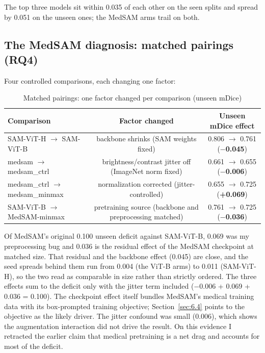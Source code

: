 \documentclass[conference]{IEEEtran}
\begin{document}
The top three models sit within 0.035 of each other on the seen splits and spread by 0.051 on the unseen ones; the MedSAM arms trail on both.


\subsection{The MedSAM diagnosis: matched pairings (RQ4)}\label{sec:6.3}
Four controlled comparisons, each changing one factor:

\begin{table}[t]
\centering
\footnotesize
\caption{Matched pairings: one factor changed per comparison (unseen mDice)}
\label{tab:6}
\begin{tabular}{lcc}
\hline
\textbf{Comparison} & \textbf{Factor changed} & \textbf{Unseen mDice effect} \\
\hline
SAM-ViT-H $\rightarrow$ SAM-ViT-B & backbone shrinks (SAM weights fixed) & 0.806 $\rightarrow$ 0.761 (\textbf{$-$0.045}) \\
medsam $\rightarrow$ medsam\_ctrl & brightness/contrast jitter off (ImageNet norm fixed) & 0.661 $\rightarrow$ 0.655 (\textbf{$-$0.006}) \\
medsam\_ctrl $\rightarrow$ medsam\_minmax & normalization corrected (jitter-controlled) & 0.655 $\rightarrow$ 0.725 (\textbf{+0.069}) \\
SAM-ViT-B $\rightarrow$ MedSAM-minmax & pretraining source (backbone and preprocessing matched) & 0.761 $\rightarrow$ 0.725 (\textbf{$-$0.036}) \\
\hline
\end{tabular}
\end{table}

Of MedSAM's original 0.100 unseen deficit against SAM-ViT-B, 0.069 was my preprocessing bug and 0.036 is the residual effect of the MedSAM checkpoint at matched size. That residual and the backbone effect (0.045) are close, and the seed spreads behind them run from 0.004 (the ViT-B arms) to 0.011 (SAM-ViT-H), so the two read as comparable in size rather than strictly ordered. The three effects sum to the deficit only with the jitter term included ($-$0.006 + 0.069 + 0.036 = 0.100). The checkpoint effect itself bundles MedSAM's medical training data with its box-prompted training objective; Section~\ref{sec:6.4} points to the objective as the likely driver. The jitter confound was small (0.006), which shows the augmentation interaction did not drive the result. On this evidence I retracted the earlier claim that medical pretraining is a net drag and accounts for most of the deficit.
\end{document}
